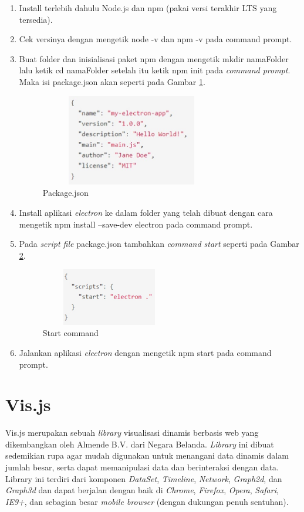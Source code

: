 \begin{enumerate}
    \item Install terlebih dahulu Node.js dan npm (pakai versi terakhir LTS yang tersedia).
    \item Cek versinya dengan mengetik node -v dan npm -v pada command prompt.
    \item Buat folder dan inisialisasi paket npm dengan mengetik mkdir namaFolder lalu ketik cd namaFolder setelah itu ketik npm init pada \textit{command prompt}. Maka isi package.json akan seperti pada Gambar \ref{fig:gambarJson}.
    
    \begin{figure}[H]
        \centering
        \includegraphics[width=8cm, height=4cm]{Gambar/Package Json.jpg}
        \caption{Package.json}
        \label{fig:gambarJson}
    \end{figure}
    \item Install aplikasi \textit{electron} ke dalam folder yang telah dibuat dengan cara mengetik npm install --save-dev electron pada command prompt.
    \item Pada \textit{script file} package.json tambahkan \textit{command start} seperti pada Gambar \ref{fig:startCommand}.
    
    \begin{figure}[H]
        \centering
        \includegraphics[width=6cm, height=2.5cm]{Gambar/json file.jpg}
        \caption{Start command}
        \label{fig:startCommand}
    \end{figure}
    \item Jalankan aplikasi \textit{electron} dengan mengetik npm start pada command prompt.
\end{enumerate}


\section{Vis.js}
Vis.js merupakan sebuah \textit{library} visualisasi dinamis berbasis web yang dikembangkan oleh Almende B.V. dari Negara Belanda. \textit{Library} ini dibuat sedemikian rupa agar mudah digunakan untuk menangani data dinamis dalam jumlah besar, serta dapat memanipulasi data dan berinteraksi dengan data. Library ini terdiri dari komponen \textit{DataSet}, \textit{Timeline}, \textit{Network}, \textit{Graph2d}, dan \textit{Graph3d} dan dapat berjalan dengan baik di \textit{Chrome}, \textit{Firefox}, \textit{Opera}, \textit{Safari}, \textit{IE9+}, dan sebagian besar \textit{mobile browser} (dengan dukungan penuh sentuhan).

